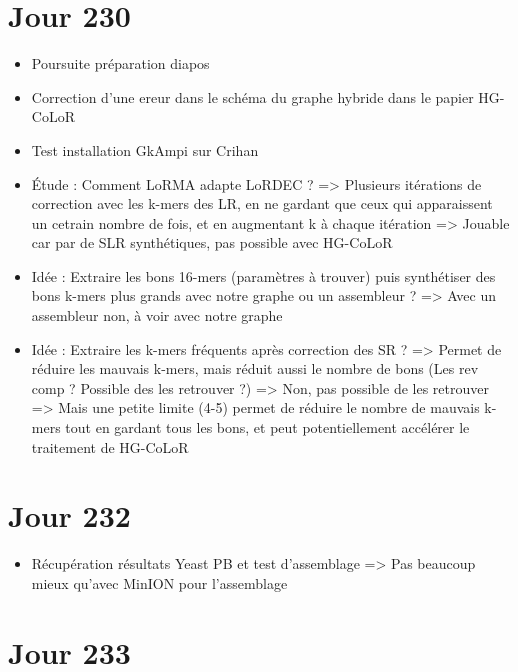 \documentclass[12pt]{report}
\begin{document}
\section{Jour 230}

\begin{itemize}
	\item Poursuite préparation diapos
	
	\item Correction d'une ereur dans le schéma du graphe hybride dans le papier HG-CoLoR
	
	\item Test installation GkAmpi sur Crihan
	
	\item Étude : Comment LoRMA adapte LoRDEC ? => Plusieurs itérations de correction avec les k-mers des LR,
		  en ne gardant que ceux qui apparaissent un cetrain nombre de fois, et en augmentant k à chaque itération
		  => Jouable car par de SLR synthétiques, pas possible avec HG-CoLoR
		  
	\item Idée : Extraire les bons 16-mers (paramètres à trouver) puis synthétiser des bons k-mers plus grands
		  avec notre graphe ou un assembleur ?
		  => Avec un assembleur non, à voir avec notre graphe
		  
	\item Idée : Extraire les k-mers fréquents après correction des SR ?
		  => Permet de réduire les mauvais k-mers, mais réduit aussi le nombre de bons (Les rev comp ? Possible des les retrouver ?)
		  		=> Non, pas possible de les retrouver
		  => Mais une petite limite (4-5) permet de réduire le nombre de mauvais k-mers tout en gardant tous les bons, et peut potentiellement
		  	 accélérer le traitement de HG-CoLoR 
\end{itemize}

\section{Jour 232}

\begin{itemize}
	\item Récupération résultats Yeast PB et test d'assemblage => Pas beaucoup mieux qu'avec MinION pour l'assemblage
\end{itemize}

\section{Jour 233}
\end{document}
